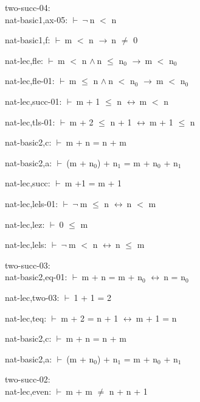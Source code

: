 \documentclass[a4paper]{article}
\newcommand{\Fol}{\mbox{$\vdash\ $}}
\newcommand{\Not}{\mbox{$\neg\ $}}
\newcommand{\And}{\mbox{$\wedge\ $}}
\newcommand{\Imp}{\mbox{$\rightarrow\ $}}
\newcommand{\Equiv}{\mbox{$\leftrightarrow\ $}}
\begin{document}
two-succ-04:\\ nat-basic1,ax-05: 
 \Fol \Not n $<$ n



nat-basic1,f: 
 \Fol m $<$ n \Imp n $\neq$ 0



nat-lec,fle: 
 \Fol m $<$ n \And n $\le$ $\mbox{n}_{0}$ \Imp m $<$ $\mbox{n}_{0}$



nat-lec,fle-01: 
 \Fol m $\le$ n \And n $<$ $\mbox{n}_{0}$ \Imp m $<$ $\mbox{n}_{0}$



nat-lec,succ-01: 
 \Fol m + 1 $\le$ n \Equiv m $<$ n



nat-lec,tls-01: 
 \Fol m + 2 $\le$ n + 1 \Equiv m + 1 $\le$ n



nat-basic2,c: 
 \Fol m + n = n + m



nat-basic2,a: 
 \Fol (m + $\mbox{n}_{0}$) + $\mbox{n}_{1}$ = m + $\mbox{n}_{0}$ + $\mbox{n}_{1}$



nat-lec,succ: 
 \Fol m +1 = m + 1



nat-lec,lels-01: 
 \Fol \Not m $\le$ n \Equiv n $<$ m



nat-lec,lez: 
 \Fol 0 $\le$ m



nat-lec,lels: 
 \Fol \Not m $<$ n \Equiv n $\le$ m



\bigskip

two-succ-03:\\ nat-basic2,eq-01: 
 \Fol m + n = m + $\mbox{n}_{0}$ \Equiv n = $\mbox{n}_{0}$



nat-lec,two-03: 
 \Fol 1 + 1 = 2



nat-lec,teq: 
 \Fol m + 2 = n + 1 \Equiv m + 1 = n



nat-basic2,c: 
 \Fol m + n = n + m



nat-basic2,a: 
 \Fol (m + $\mbox{n}_{0}$) + $\mbox{n}_{1}$ = m + $\mbox{n}_{0}$ + $\mbox{n}_{1}$



\bigskip

two-succ-02:\\ nat-lec,even: 
 \Fol m + m $\neq$ n + n + 1
\end{document}
